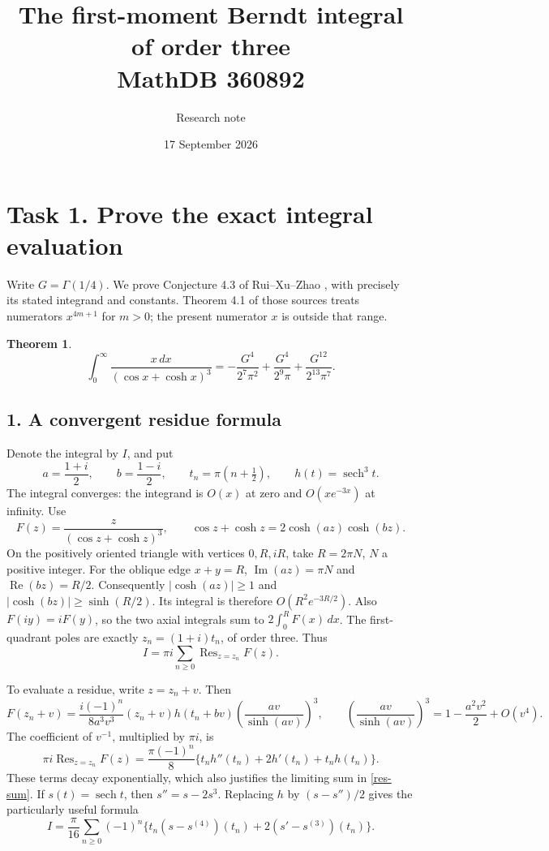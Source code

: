 \documentclass[11pt]{article}
\title{The first-moment Berndt integral of order three\\MathDB 360892}
\author{Research note}
\date{17 September 2026}
\newcommand{\sech}{\operatorname{sech}}
\newcommand{\Res}{\operatorname{Res}}
\newtheorem{theorem}{Theorem}
\begin{document}
\maketitle

\section*{Task 1. Prove the exact integral evaluation}
Write $G=\Gamma(1/4)$. We prove Conjecture 4.3 of Rui--Xu--Zhao
\cite{RXZ,RS}, with precisely its stated integrand and constants.
Theorem 4.1 of those sources treats numerators $x^{4m+1}$ for $m>0$;
the present numerator $x$ is outside that range.

\begin{theorem}
\[
 \boxed{\displaystyle
 \int_0^\infty\frac{x\,dx}{(\cos x+\cosh x)^3}
 =-\frac{G^4}{2^7\pi^2}+\frac{G^4}{2^9\pi}
                         +\frac{G^{12}}{2^{13}\pi^7}.}
\]
\end{theorem}

\subsection*{1. A convergent residue formula}
Denote the integral by $I$, and put
\[
 a=\frac{1+i}{2},\qquad b=\frac{1-i}{2},\qquad
 t_n=\pi(n+\tfrac12),\qquad h(t)=\sech^3t.
\]
The integral converges: the integrand is $O(x)$ at zero and
$O(xe^{-3x})$ at infinity. Use
\[
 F(z)=\frac{z}{(\cos z+\cosh z)^3},\qquad
 \cos z+\cosh z=2\cosh(az)\cosh(bz).
\]
On the positively oriented triangle with vertices $0,R,iR$, take
$R=2\pi N$, $N$ a positive integer. For the oblique edge $x+y=R$,
$\operatorname{Im}(az)=\pi N$ and $\operatorname{Re}(bz)=R/2$.
Consequently $|\cosh(az)|\ge1$ and
$|\cosh(bz)|\ge\sinh(R/2)$. Its integral is therefore
$O(R^2e^{-3R/2})$. Also $F(iy)=iF(y)$, so the two axial integrals
sum to $2\int_0^R F(x)\,dx$. The first-quadrant poles are exactly
$z_n=(1+i)t_n$, of order three. Thus
\begin{equation}\label{res-sum}
 I=\pi i\sum_{n\ge0}\Res_{z=z_n}F(z).
\end{equation}

To evaluate a residue, write $z=z_n+v$. Then
\[
 F(z_n+v)=\frac{i(-1)^n}{8a^3v^3}
       (z_n+v)h(t_n+bv)\left(\frac{av}{\sinh(av)}\right)^3,
 \qquad
 \left(\frac{av}{\sinh(av)}\right)^3
             =1-\frac{a^2v^2}{2}+O(v^4).
\]
The coefficient of $v^{-1}$, multiplied by $\pi i$, is
\[
 \pi i\Res_{z=z_n}F(z)
 =\frac{\pi(-1)^n}{8}
       \{t_n h''(t_n)+2h'(t_n)+t_n h(t_n)\}.
\]
These terms decay exponentially, which also justifies the limiting
sum in \eqref{res-sum}. If $s(t)=\sech t$, then $s''=s-2s^3$.
Replacing $h$ by $(s-s'')/2$ gives the particularly useful formula
\begin{equation}\label{reduced}
 I=\frac{\pi}{16}\sum_{n\ge0}(-1)^n
 \{t_n(s-s^{(4)})(t_n)+2(s'-s^{(3)})(t_n)\}.
\end{equation}
\end{document}
